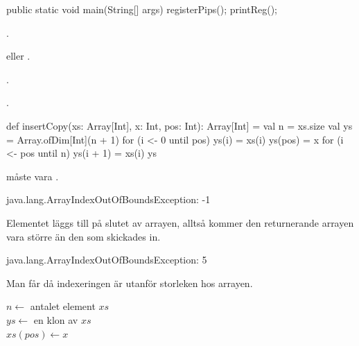 {\begin{Code}[language=Java,numbers=left]
{	public static void main(String[] args) {
		registerPips();
		printReg();
	}
}
\end{Code}

\Task %

\Subtask {}.

\Subtask {} eller .

\Subtask {}.

\Subtask {}.



\ExtraTasks %

\Task %

\Subtask \begin{Code}
def insertCopy(xs: Array[Int], x: Int, pos: Int): Array[Int] = {
  val n = xs.size
  val ys = Array.ofDim[Int](n + 1)
  for (i <- 0 until pos) ys(i) = xs(i)
  ys(pos) = x
  for (i <- pos until n) ys(i + 1) = xs(i)
  ys
} 
\end{Code}

\Subtask {} måste vara .

\Subtask \begin{REPL}
java.lang.ArrayIndexOutOfBoundsException: -1
\end{REPL}

\Subtask Elementet  läggs till på slutet av arrayen, alltså kommer den returnerande arrayen vara större än den som skickades in.

\Subtask \begin{REPL}
java.lang.ArrayIndexOutOfBoundsException: 5
\end{REPL}
Man får  då indexeringen är utanför storleken hos arrayen.

\Task %

\Subtask 

\begin{algorithm}[H]
 
 $n \leftarrow$ antalet element $xs$\\ 
 $ys \leftarrow$ en klon av $xs$\\
 $xs(pos) \leftarrow x$\\ 
\end{algorithm}

}
